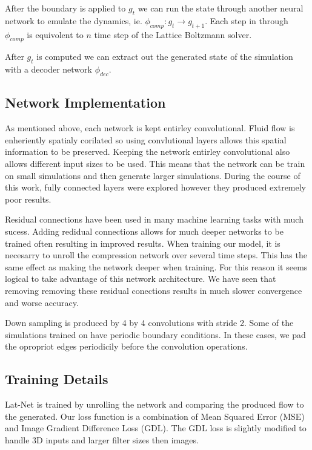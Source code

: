 \documentclass{article}
\begin{document}
After the boundary is applied to $g_t$ we can run the state through another neural network to emulate the dynamics, ie. $\phi_{comp}:g_{t} \rightarrow g_{t+1}$. Each step in through $\phi_{comp}$ is equivolent to $n$ time step of the Lattice Boltzmann solver.

After $g_t$ is computed we can extract out the generated state of the simulation with a decoder network $\phi_{dec}$. 


\subsection{Network Implementation}

As mentioned above, each network is kept entirley convolutional. Fluid flow is enheriently spatialy corilated so using convlutional layers allows this spatial information to be preserved. Keeping the network entirley convolutional also allows different input sizes to be used. This means that the network can be train on small simulations and then generate larger simulations. During the course of this work, fully connected layers were explored however they produced extremely poor results.

Residual connections have been used in many machine learning tasks with much sucess. Adding redidual connections allows for much deeper networks to be trained often resulting in improved results. When training our model, it is necesarry to unroll the compression network over several time steps. This has the same effect as making the network deeper when training. For this reason it seems logical to take advantage of this network architecture. We have seen that removing removing these residual conections results in much slower convergence and worse accuracy.

Down sampling is produced by 4 by 4 convolutions with stride 2. Some of the simulations trained on have periodic boundary conditions. In these cases, we pad the opropriot edges periodicily before the convolution operations.


\subsection{Training Details}

Lat-Net is trained by unrolling the network and comparing the produced flow to the generated. Our loss function is a combination of Mean Squared Error (MSE) and Image Gradient Difference Loss (GDL)\cite{mathieu2015deep}. The GDL loss is slightly modified to handle 3D inputs and larger filter sizes then images.
\end{document}
